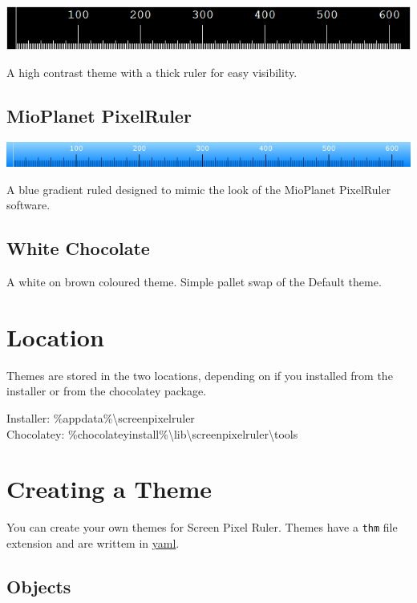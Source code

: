 \documentclass[
]{book}
\begin{document}
\includegraphics{images/theme-panda.png}

A high contrast theme with a thick ruler for easy visibility.

\hypertarget{mioplanet-pixelruler}{%
\subsection{MioPlanet PixelRuler}\label{mioplanet-pixelruler}}

\includegraphics{images/theme-mioplanet.png}

A blue gradient ruled designed to mimic the look of the MioPlanet PixelRuler software.

\hypertarget{white-chocolate}{%
\subsection{White Chocolate}\label{white-chocolate}}

A white on brown coloured theme.
Simple pallet swap of the Default theme.

\hypertarget{location-1}{%
\section{Location}\label{location-1}}

Themes are stored in the two locations, depending on if you installed from the installer or from the chocolatey package.

Installer: \%appdata\%\textbackslash screenpixelruler\\
Chocolatey: \%chocolateyinstall\%\textbackslash lib\textbackslash screenpixelruler\textbackslash tools

\hypertarget{creating-a-theme}{%
\section{Creating a Theme}\label{creating-a-theme}}

You can create your own themes for Screen Pixel Ruler.
Themes have a \texttt{thm} file extension and are writtem in \href{https://yaml.org}{yaml}.

\hypertarget{objects}{%
\subsection{Objects}\label{objects}}
\end{document}
